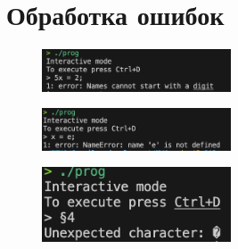 \documentclass[12pt,onecolumn]{article}
\begin{document}
\section{Обработка ошибок}
\begin{figure}[H]
    \centering
    \includegraphics[width=0.5\textwidth]{image/error1.png}
\end{figure}
\begin{figure}[H]
    \centering
    \includegraphics[width=0.5\textwidth]{image/error2.png}
\end{figure}
\begin{figure}[H]
    \centering
    \includegraphics[width=0.5\textwidth]{image/error3.png}
\end{figure}
\end{document}

